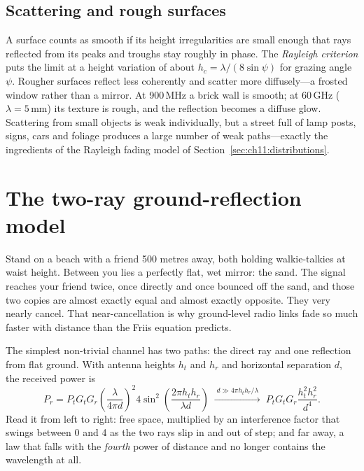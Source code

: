 \subsection{Scattering and rough surfaces}

A surface counts as smooth if its height irregularities are small enough that rays reflected
from its peaks and troughs stay roughly in phase. The \emph{Rayleigh criterion} puts the limit
at a height variation of about $h_c=\lambda/(8\sin\psi)$ for grazing angle $\psi$. Rougher
surfaces reflect less coherently and scatter more diffusely---a frosted window rather than a
mirror. At 900\,MHz a brick wall is smooth; at 60\,GHz ($\lambda=5$\,mm) its texture is rough,
and the reflection becomes a diffuse glow. Scattering from small objects is weak individually,
but a street full of lamp posts, signs, cars and foliage produces a large number of weak
paths---exactly the ingredients of the Rayleigh fading model of Section~\ref{sec:ch11:distributions}.

\section{The two-ray ground-reflection model}
\label{sec:ch11:tworay}

Stand on a beach with a friend 500 metres away, both holding walkie-talkies at waist height.
Between you lies a perfectly flat, wet mirror: the sand. The signal reaches your friend twice,
once directly and once bounced off the sand, and those two copies are almost exactly equal and
almost exactly opposite. They very nearly cancel. That near-cancellation is why ground-level
radio links fade so much faster with distance than the Friis equation predicts.


The simplest non-trivial channel has two paths: the direct ray and one reflection from flat
ground. With antenna heights $h_t$ and $h_r$ and horizontal separation $d$, the received power is
\begin{equation}
P_r=P_tG_tG_r\left(\frac{\lambda}{4\pi d}\right)^2 4\sin^2\!\left(\frac{2\pi h_th_r}{\lambda d}\right)
\;\xrightarrow{\;d\gg4\pi h_th_r/\lambda\;}\;
P_tG_tG_r\frac{h_t^2h_r^2}{d^4}.
\label{eq:ch11:tworay}
\end{equation}
Read it from left to right: free space, multiplied by an interference factor that swings between
0 and 4 as the two rays slip in and out of step; and far away, a law that falls with the
\emph{fourth} power of distance and no longer contains the wavelength at all.

